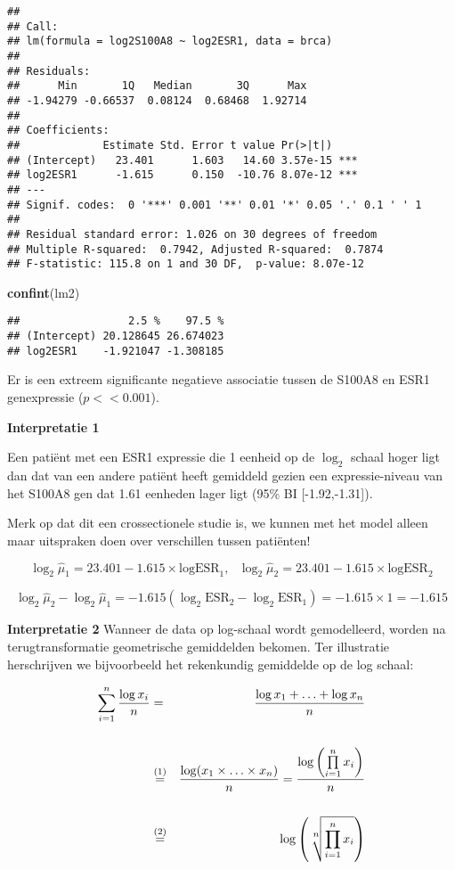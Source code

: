 \documentclass[
  12pt,dutch,coursenotes]{book}
\newenvironment{Shaded}{\begin{snugshade}}{\end{snugshade}}
\newcommand{\KeywordTok}[1]{\textcolor[rgb]{0.13,0.29,0.53}{\textbf{#1}}}
\newcommand{\NormalTok}[1]{#1}
\theoremstyle{definition}
\theoremstyle{definition}
\theoremstyle{definition}
\theoremstyle{remark}
\begin{document}
\begin{verbatim}
## 
## Call:
## lm(formula = log2S100A8 ~ log2ESR1, data = brca)
## 
## Residuals:
##      Min       1Q   Median       3Q      Max 
## -1.94279 -0.66537  0.08124  0.68468  1.92714 
## 
## Coefficients:
##             Estimate Std. Error t value Pr(>|t|)    
## (Intercept)   23.401      1.603   14.60 3.57e-15 ***
## log2ESR1      -1.615      0.150  -10.76 8.07e-12 ***
## ---
## Signif. codes:  0 '***' 0.001 '**' 0.01 '*' 0.05 '.' 0.1 ' ' 1
## 
## Residual standard error: 1.026 on 30 degrees of freedom
## Multiple R-squared:  0.7942, Adjusted R-squared:  0.7874 
## F-statistic: 115.8 on 1 and 30 DF,  p-value: 8.07e-12
\end{verbatim}

\begin{Shaded}
\begin{Highlighting}[]
\KeywordTok{confint}\NormalTok{(lm2)}
\end{Highlighting}
\end{Shaded}

\begin{verbatim}
##                 2.5 %    97.5 %
## (Intercept) 20.128645 26.674023
## log2ESR1    -1.921047 -1.308185
\end{verbatim}

Er is een extreem significante negatieve associatie tussen de S100A8 en ESR1 genexpressie (\(p<<0.001\)).

\textbf{Interpretatie 1}

Een patiënt met een ESR1 expressie die 1 eenheid op de \(\log_2\) schaal hoger ligt dan dat van een andere patiënt heeft gemiddeld gezien een expressie-niveau van het S100A8 gen dat 1.61 eenheden lager ligt (95\% BI {[}-1.92,-1.31{]}).

Merk op dat dit een crossectionele studie is, we kunnen met het model alleen maar uitspraken doen over verschillen tussen patiënten!

\[\log_2 \hat\mu_1=23.401  -1.615 \times \text{logESR}_1,\text{ } \log_2 \hat\mu_2=23.401  -1.615 \times \text{logESR}_2 \]

\[\log_2 \hat\mu_2-\log_2 \hat\mu_1=  -1.615 (\log_2 \text{ESR}_2-\log_2 \text{ESR}_1) = -1.615 \times 1 = -1.615\]

\textbf{Interpretatie 2}
Wanneer de data op log-schaal wordt gemodelleerd, worden na terugtransformatie geometrische gemiddelden bekomen.
Ter illustratie herschrijven we bijvoorbeeld het rekenkundig gemiddelde op de log schaal:

\begin{eqnarray*}
\sum\limits_{i=1}^n \frac{\log x_i}{n}&=&\frac{\log x_1 + \ldots + \log x_n}{n}\\\\
&\stackrel{(1)}{=}&\frac{\log(x_1 \times \ldots \times x_n)}{n}=\frac{\log\left(\prod\limits_{i=1}^n x_i\right)}{n}\\\\
&\stackrel{(2)}{=}&\log \left(\sqrt[\leftroot{-1}\uproot{2}\scriptstyle n]{\prod\limits_{i=1}^n x_i}\right)
\end{eqnarray*}
\end{document}
